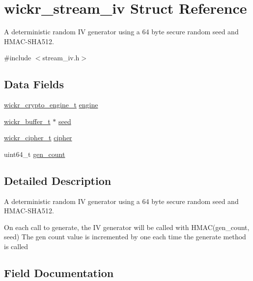 \hypertarget{structwickr__stream__iv}{}\section{wickr\+\_\+stream\+\_\+iv Struct Reference}
\label{structwickr__stream__iv}


A deterministic random IV generator using a 64 byte secure random seed and H\+M\+A\+C-\/\+S\+H\+A512.  




{\ttfamily \#include $<$stream\+\_\+iv.\+h$>$}

\subsection*{Data Fields}
\begin{DoxyCompactItemize}
\item 
\hyperlink{structwickr__crypto__engine}{wickr\+\_\+crypto\+\_\+engine\+\_\+t} \hyperlink{structwickr__stream__iv_a8c597718ade583db19204df7bfed7e85}{engine}
\item 
\hyperlink{structwickr__buffer}{wickr\+\_\+buffer\+\_\+t} $\ast$ \hyperlink{structwickr__stream__iv_a221017bc41b4cc36bf31f13a0c299db1}{seed}
\item 
\hyperlink{structwickr__cipher}{wickr\+\_\+cipher\+\_\+t} \hyperlink{structwickr__stream__iv_a86379d83e28b96d4852ac047482713d1}{cipher}
\item 
uint64\+\_\+t \hyperlink{structwickr__stream__iv_ae7d500c34333c546ee044fe875e10dfc}{gen\+\_\+count}
\end{DoxyCompactItemize}


\subsection{Detailed Description}
A deterministic random IV generator using a 64 byte secure random seed and H\+M\+A\+C-\/\+S\+H\+A512. 

On each call to generate, the IV generator will be called with H\+M\+A\+C(gen\+\_\+count, seed) The gen count value is incremented by one each time the generate method is called 

\subsection{Field Documentation}
\mbox{\label{structwickr__stream__iv_a86379d83e28b96d4852ac047482713d1}} 
